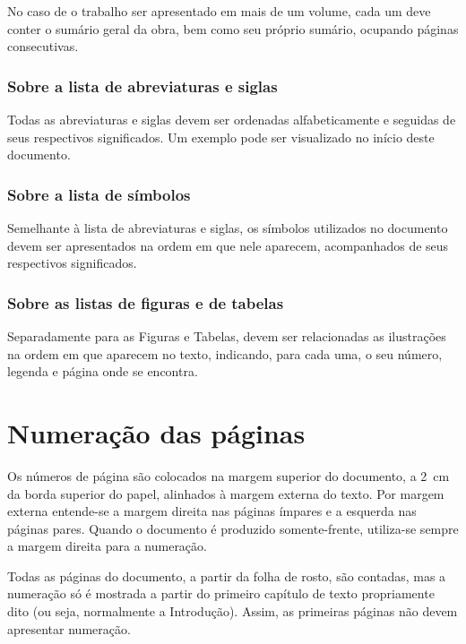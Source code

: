 No caso de o trabalho ser apresentado em mais de um volume, cada um deve conter o sumário geral da obra, bem como seu próprio sumário, ocupando páginas consecutivas.

\subsubsection{Sobre a lista de abreviaturas e siglas}

Todas as abreviaturas e siglas devem ser ordenadas alfabeticamente e seguidas de seus respectivos significados. Um exemplo pode ser visualizado no início deste documento.

\subsubsection{Sobre a lista de símbolos}

Semelhante à lista de abreviaturas e siglas, os símbolos utilizados no documento devem ser apresentados na ordem em que nele aparecem, acompanhados de seus respectivos significados.

\subsubsection{Sobre as listas de figuras e de tabelas}

Separadamente para as Figuras e Tabelas, devem ser relacionadas as ilustrações na ordem em que aparecem no texto, indicando, para cada uma, o seu número, legenda e página onde se encontra.

\section{Numeração das páginas}

Os números de página são colocados na margem superior do documento, a 2 cm da borda superior do papel, alinhados à margem externa do texto. Por margem externa entende-se a margem direita nas páginas ímpares e a esquerda nas páginas pares. Quando o documento é produzido somente-frente, utiliza-se sempre a margem direita para a numeração.

Todas as páginas do documento, a partir da folha de rosto, são contadas, mas a numeração só é mostrada a partir do primeiro capítulo de texto propriamente dito (ou seja, normalmente a Introdução). Assim, as primeiras páginas não devem apresentar numeração.
